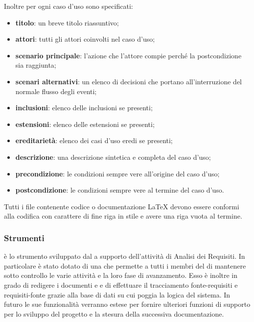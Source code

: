 \documentclass[a4paper, titlepage]{article}
\begin{document}
Inoltre per ogni caso d'uso sono specificati:
\begin{itemize}
\item \textbf{titolo}: un breve titolo riassuntivo;
\item \textbf{attori}: tutti gli attori coinvolti nel caso d'uso;
\item \textbf{scenario principale}: l'azione che l'attore compie perché la postcondizione sia raggiunta;
\item \textbf{scenari alternativi}: un elenco di decisioni che portano all'interruzione del normale flusso degli eventi;
\item \textbf{inclusioni}: elenco delle inclusioni se presenti;
\item \textbf{estensioni}: elenco delle estensioni se presenti;
\item \textbf{ereditarietà}: elenco dei casi d'uso eredi se presenti;
\item \textbf{descrizione}: una descrizione sintetica e completa del caso d'uso;
\item \textbf{precondizione}: le condizioni sempre vere all'origine del caso d'uso;
\item \textbf{postcondizione}: le condizioni sempre vere al termine del caso d'uso.
\end{itemize}

Tutti i file contenente codice o documentazione \LaTeX{} devono essere conformi alla codifica  con carattere di fine riga in stile  e avere una riga vuota al termine.

\subsubsection{Strumenti}

 è lo strumento sviluppato dal  a supporto dell'attività di Analisi dei Requisiti. In particolare è stato dotato di una  che permette a tutti i membri del  di mantenere sotto controllo le varie attività e la loro fase di avanzamento. Esso è inoltre in grado di redigere i documenti  e  e di effettuare il tracciamento fonte-requisiti e requisiti-fonte grazie alla base di dati su cui poggia la logica del sistema. In futuro le sue funzionalità verranno estese per fornire ulteriori funzioni
di supporto per lo sviluppo del progetto e la stesura della successiva documentazione.
\end{document}
